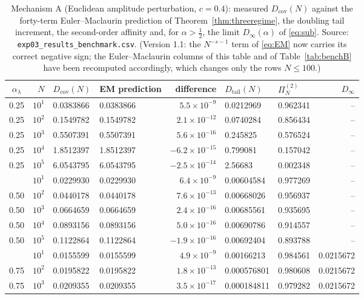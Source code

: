 \documentclass[11pt,reqno]{amsart}
\theoremstyle{plain}
\theoremstyle{definition}
\theoremstyle{remark}
\numberwithin{equation}{section}
\newcommand{\Dcov}{D_{\mathrm{cov}}}
\newcommand{\Dtail}{D_{\mathrm{tail}}}
\begin{document}
\begin{table}[p]
\centering\footnotesize\setlength{\tabcolsep}{4pt}
\caption{Mechanism A (Euclidean amplitude perturbation, $c=0.4$): measured $\Dcov(N)$ against the forty-term Euler--Maclaurin prediction of Theorem~\ref{thm:threeregime}, the doubling tail increment, the second-order affinity and, for $\alpha>\tfrac12$, the limit $D_\infty(\alpha)$ of \eqref{eq:sub}. Source: \texttt{exp03\_results\_benchmark.csv}. (Version 1.1: the $N^{-s-1}$ term of \eqref{eq:EM} now carries its correct negative sign; the Euler--Maclaurin columns of this table and of Table~\ref{tab:benchB} have been recomputed accordingly, which changes only the rows $N\le100$.)}
\label{tab:benchA}
\begin{tabular}{@{}crllrllr@{}}
\toprule
$\alpha_\lambda$ & $N$ & $\Dcov(N)$ & EM prediction & difference & $\Dtail(N)$ & $\Pi^{(2)}_N$ & $D_\infty$ \\
\midrule
0.25 & $10^{1}$ & 0.0383866 & 0.0383866 & $5.5\times10^{-9}$ & 0.0212969 & 0.962341 & -- \\
0.25 & $10^{2}$ & 0.1549782 & 0.1549782 & $2.1\times10^{-12}$ & 0.0740284 & 0.856434 & -- \\
0.25 & $10^{3}$ & 0.5507391 & 0.5507391 & $5.6\times10^{-16}$ & 0.245825 & 0.576524 & -- \\
0.25 & $10^{4}$ & 1.8512397 & 1.8512397 & $-6.2\times10^{-15}$ & 0.799081 & 0.157042 & -- \\
0.25 & $10^{5}$ & 6.0543795 & 6.0543795 & $-2.5\times10^{-14}$ & 2.56683 & 0.002348 & -- \\
\addlinespace
0.50 & $10^{1}$ & 0.0229930 & 0.0229930 & $6.4\times10^{-9}$ & 0.00604584 & 0.977269 & -- \\
0.50 & $10^{2}$ & 0.0440178 & 0.0440178 & $7.6\times10^{-13}$ & 0.00668026 & 0.956937 & -- \\
0.50 & $10^{3}$ & 0.0664659 & 0.0664659 & $2.4\times10^{-16}$ & 0.00685561 & 0.935695 & -- \\
0.50 & $10^{4}$ & 0.0893156 & 0.0893156 & $5.0\times10^{-16}$ & 0.00690786 & 0.914557 & -- \\
0.50 & $10^{5}$ & 0.1122864 & 0.1122864 & $-1.9\times10^{-16}$ & 0.00692404 & 0.893788 & -- \\
\addlinespace
0.75 & $10^{1}$ & 0.0155599 & 0.0155599 & $4.9\times10^{-9}$ & 0.00166213 & 0.984561 & 0.0215672 \\
0.75 & $10^{2}$ & 0.0195822 & 0.0195822 & $1.8\times10^{-13}$ & 0.000576801 & 0.980608 & 0.0215672 \\
0.75 & $10^{3}$ & 0.0209355 & 0.0209355 & $3.5\times10^{-17}$ & 0.000184811 & 0.979282 & 0.0215672 \\

\end{tabular}
\end{table}
\end{document}
